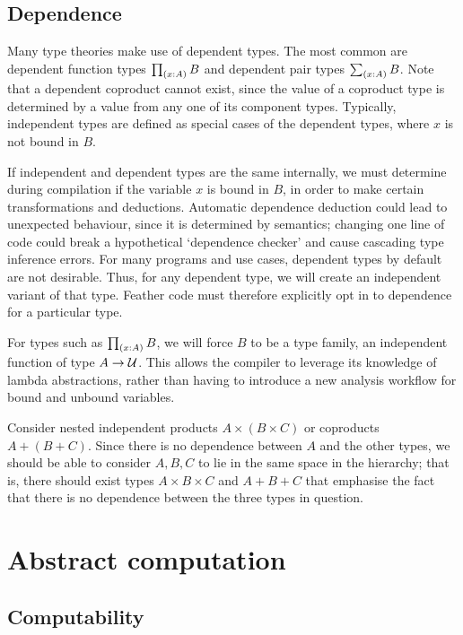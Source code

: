 \documentclass[11pt]{book}
\begin{document}
\subsection{Dependence}

Many type theories make use of dependent types.
The most common are dependent function types \( \tprd{x:A} B \) and dependent pair types \( \tsm{x:A} B \).
Note that a dependent coproduct cannot exist, since the value of a coproduct type is determined by a value from any one of its component types.
Typically, independent types are defined as special cases of the dependent types, where \( x \) is not bound in \( B \).

If independent and dependent types are the same internally, we must determine during compilation if the variable \( x \) is bound in \( B \), in order to make certain transformations and deductions.
Automatic dependence deduction could lead to unexpected behaviour, since it is determined by semantics; changing one line of code could break a hypothetical `dependence checker' and cause cascading type inference errors.
For many programs and use cases, dependent types by default are not desirable.
Thus, for any dependent type, we will create an independent variant of that type.
Feather code must therefore explicitly opt in to dependence for a particular type.

For types such as \( \tprd{x:A} B \), we will force \( B \) to be a type family, an independent function of type \( A \to \mathcal{U} \).
This allows the compiler to leverage its knowledge of lambda abstractions, rather than having to introduce a new analysis workflow for bound and unbound variables.

Consider nested independent products \( A \times (B \times C) \) or coproducts \( A + (B + C) \).
Since there is no dependence between \( A \) and the other types, we should be able to consider \( A, B, C \) to lie in the same space in the hierarchy; that is, there should exist types \( A \times B \times C \) and \( A + B + C \) that emphasise the fact that there is no dependence between the three types in question.

\section{Abstract computation}

\subsection{Computability}
\end{document}
